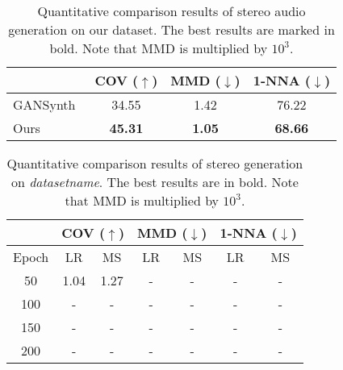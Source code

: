 \begin{table}[t]
    \centering
    \begin{tabular}{l|c|c|c}
        \toprule
         & COV ($\uparrow$) & MMD ($\downarrow$) & 1-NNA ($\downarrow$)\\
         \midrule
         GANSynth~\cite{gansynth} & 34.55 & 1.42 & 76.22 \\
         Ours & \textbf{45.31} & \textbf{1.05} & \textbf{68.66} \\
         \bottomrule
         
    \end{tabular}
    \caption{Quantitative comparison results of stereo audio generation on our dataset.
    	The best results are marked in bold. Note that MMD is multiplied by $10^3$.}
    \label{table:result}
\end{table}

\begin{table}[t]
\centering
    \begin{tabular}{c|cc|cc|cc}
		\toprule
		 & \multicolumn{2}{c|}{COV ($\uparrow$)} & \multicolumn{2}{c|}{MMD ($\downarrow$)} &  \multicolumn{2}{c}{1-NNA ($\downarrow$)}\\
		\midrule
		Epoch & \multicolumn{1}{c|}{LR} & \multicolumn{1}{c|}{MS} & \multicolumn{1}{c|}{LR} & \multicolumn{1}{c|}{MS} & \multicolumn{1}{c|}{LR} & \multicolumn{1}{c}{MS} \\
		\midrule
		50&  1.04 & 1.27 & - & - & - & - \\
		100&  - & - & - & - & - & - \\
		150&  - & - & - & - & - & - \\
		200&  - & - & - & - & - & - \\
		\bottomrule
	\end{tabular}
    \caption{
    	Quantitative comparison results of stereo generation on \textit{datasetname}.
    	The best results are in bold.
    	Note that MMD is multiplied by $10^3$. 
    }
    \label{table:result}
    
\end{table}
\fi